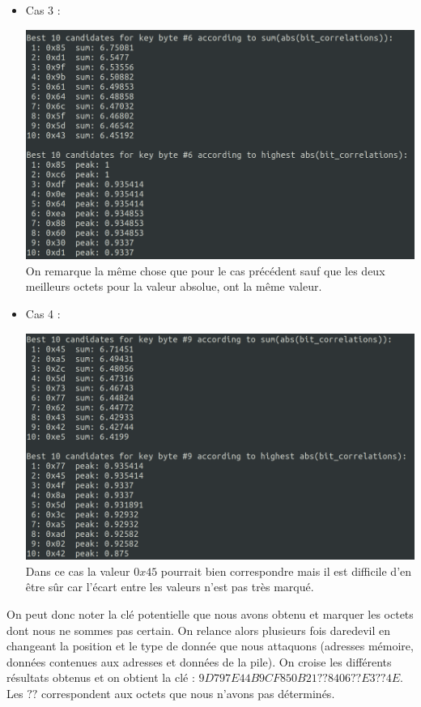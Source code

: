 \documentclass[10pt,a4paper]{article}
\begin{document}
\begin{itemize}
\item Cas 3 :\\
\begin{center}
\includegraphics[scale=0.25]{Images/Resultat_26_cas_3}\\
On remarque la même chose que pour le cas précédent sauf que les deux meilleurs octets pour la valeur absolue, ont la même valeur. 
\end{center}

\item Cas 4 :\\
\begin{center}
\includegraphics[scale=0.25]{Images/Resultat_26_cas_4}\\
Dans ce cas la valeur $0x45$ pourrait bien correspondre mais il est difficile d'en être sûr car l'écart entre les valeurs n'est pas très marqué.\\
\end{center}
\end{itemize}
\vspace{\baselineskip}
On peut donc noter la clé potentielle que nous avons obtenu et marquer les octets dont nous ne sommes pas certain. On relance alors plusieurs fois daredevil en changeant la position et le type de donnée que nous attaquons (adresses mémoire, données contenues aux adresses et données de la pile). On croise les différents résultats obtenus et on obtient la clé : $9D797E44B9CF850B21??8406??E3??4E$.  Les $??$ correspondent aux octets que nous n'avons pas déterminés.\\
\end{document}
